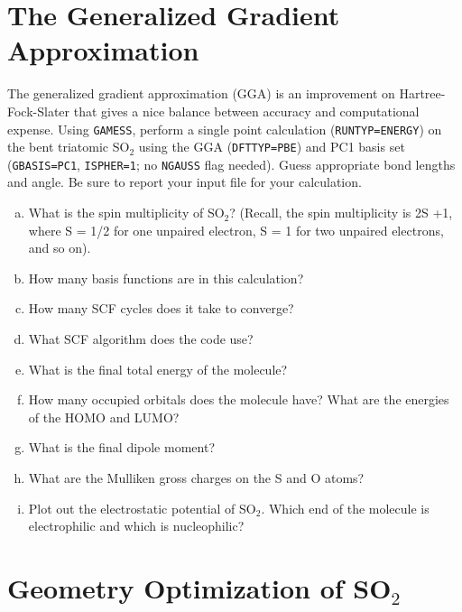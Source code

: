 \documentclass[11pt]{article}
\begin{document}
\section{The Generalized Gradient Approximation}
\label{sec-2}

The generalized gradient approximation (GGA) is an improvement on Hartree-Fock-Slater that gives a nice balance between accuracy and computational expense. Using \texttt{GAMESS}, perform a single point calculation (\verb~RUNTYP=ENERGY~) on the bent triatomic SO$_{\text{2}}$ using the GGA (\verb~DFTTYP=PBE~) and PC1 basis set (\verb~GBASIS=PC1~, \verb~ISPHER=1~; no \verb~NGAUSS~ flag needed). Guess appropriate bond lengths and angle. Be sure to report your input file for your calculation.

\begin{enumerate}[(a)]
\item What is the spin multiplicity of SO$_{\text{2}}$? (Recall, the spin multiplicity is 2S +1, where S = 1/2 for one unpaired electron, S = 1 for two unpaired electrons, and so on).

\item How many basis functions are in this calculation?

\item How many SCF cycles does it take to converge?

\item What SCF algorithm does the code use?

\item What is the final total energy of the molecule?

\item How many occupied orbitals does the molecule have? What are the energies of the HOMO and LUMO?

\item What is the final dipole moment?

\item What are the Mulliken gross charges on the S and O atoms?

\item Plot out the electrostatic potential of SO$_{\text{2}}$. Which end of the molecule is electrophilic and which is nucleophilic?
\end{enumerate}

\section{Geometry Optimization of SO$_{\text{2}}$}
\label{sec-3}
\end{document}
